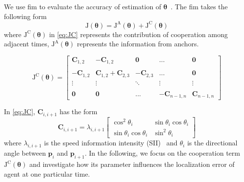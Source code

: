 \documentclass[conference]{IEEEtran}
\begin{document}
We use \ac{fim} to evaluate the accuracy of estimation of $\bm{\theta}$~\cite{LimitBound2}. The \ac{fim} takes the following form
\begin{equation}
\bm{\mathrm{J}}(\bm{\theta})=\bm{\mathrm{J}}^\mathrm{A}(\bm{\theta})+\bm{\mathrm{J}}^\mathrm{C}(\bm{\theta})
\end{equation}
where $\bm{\mathrm{J}}^\mathrm{C}(\bm{\theta})$ in \eqref{eq:JC} represents the contribution of cooperation among adjacent times, $\bm{\mathrm{J}}^\mathrm{A}(\bm{\theta})$ represents the information from anchors. 
\begin{figure}[t]
\begin{equation}\label{eq:JC}
\bm{\mathrm{J}}^\mathrm{C}(\bm{\theta})=
\begin{bmatrix}
\bm{C}_{1,2}&-\bm{C}_{1,2}&\bm{0}&\dots&\bm{0}\\
&&&&\\
-\bm{C}_{1,2} & \bm{C}_{1,2}+\bm{C}_{2,3}&-\bm{C}_{2,3}&\dots&\bm{0}\\
\vdots &\vdots&\ddots &\vdots&\vdots\\
&&&&\\
\bm{0}&\bm{0}&...& -\bm{C}_{n-1,n}&\bm{C}_{n-1,n}
\end{bmatrix}
\end{equation}
\hrulefill
\end{figure}
In \eqref{eq:JC}, $\bm{C}_{i,i+1}$ has the form
\begin{equation}
\bm{C}_{i,i+1}=\lambda_{i,i+1}\begin{bmatrix}
\cos^2 \theta_i & \sin \theta_i \cos \theta_i\\
\sin \theta_i \cos \theta_i & \sin^2 \theta_i 
\end{bmatrix}
\end{equation}
where $\lambda_{i,i+1}$ is the speed information intensity (SII)~\cite{LimitBound2} 
and $\theta_i$ is the directional angle between $\bm{p}_i$ and $\bm{p}_{i+1}$. 
In the following, we focus on the cooperation term $\bm{\mathrm{J}}^\mathrm{C}(\bm{\theta})$ and 
investigate how its parameter influences the localization error of agent at one particular time.
\end{document}
